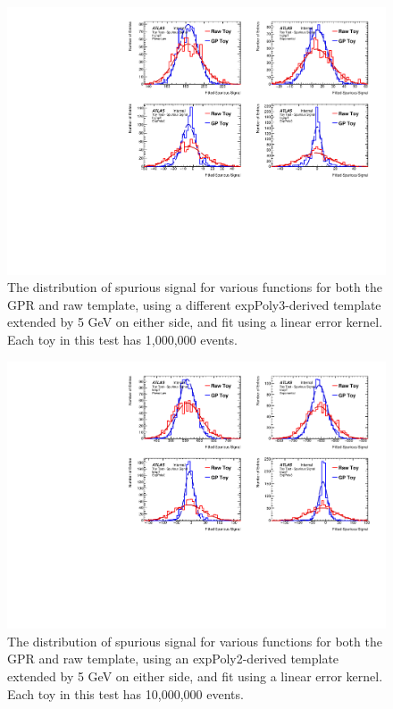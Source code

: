 \begin{figure} 
\begin{center}
  \includegraphics[width=\textwidth]{figures/background/gpr/validation/linear/ToyTest_FitSigVals_highpT_1M_noSig}   
\caption{The distribution of spurious signal for various functions for both the GPR and raw template, using a different expPoly3-derived template extended by 5 GeV on either side, and fit using a linear error kernel. Each toy in this test has 1,000,000 events.}
\label{fig:linearkernel_highpt_1M_noSig}
\end{center}
\end{figure}

\begin{figure} 
\begin{center}
  \includegraphics[width=\textwidth]{figures/background/gpr/validation/linear/ToyTest_FitSigVals_lowpT_10M_noSig}   
\caption{The distribution of spurious signal for various functions for both the GPR and raw template, using an expPoly2-derived template extended by 5 GeV on either side, and fit using a linear error kernel. Each toy in this test has 10,000,000 events.}
\label{fig:linearkernel_lowpt_10M_noSig}
\end{center}
\end{figure}

